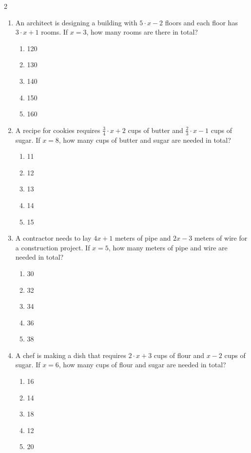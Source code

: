 \documentclass[10pt]{article}
\begin{document}
\begin{multicols}{2}
\begin{enumerate}[label=\textbf{Q\arabic*.}, leftmargin=*, itemsep=6pt, parsep=0pt]
  \item \small An architect is designing a building with $5 \cdot x - 2$ floors and each floor has $3 \cdot x + 1$ rooms. If $x = 3$, how many rooms are there in total?
  \begin{enumerate}[label=(\Alph*), leftmargin=0.6cm, nosep, itemsep=2pt]
    \item 120
    \item 130
    \item 140
    \item 150
    \item 160
  \end{enumerate}

  \item \small A recipe for cookies requires $\frac{3}{4} \cdot x + 2$ cups of butter and $\frac{2}{3} \cdot x - 1$ cups of sugar. If $x = 8$, how many cups of butter and sugar are needed in total?
  \begin{enumerate}[label=(\Alph*), leftmargin=0.6cm, nosep, itemsep=2pt]
    \item 11
    \item 12
    \item 13
    \item 14
    \item 15
  \end{enumerate}

  \item \small A contractor needs to lay $4x + 1$ meters of pipe and $2x - 3$ meters of wire for a construction project. If $x = 5$, how many meters of pipe and wire are needed in total?
  \begin{enumerate}[label=(\Alph*), leftmargin=0.6cm, nosep, itemsep=2pt]
    \item 30
    \item 32
    \item 34
    \item 36
    \item 38
  \end{enumerate}

  \item \small A chef is making a dish that requires $2 \cdot x + 3$ cups of flour and $x - 2$ cups of sugar. If $x = 6$, how many cups of flour and sugar are needed in total?
  \begin{enumerate}[label=(\Alph*), leftmargin=0.6cm, nosep, itemsep=2pt]
    \item 16
    \item 14
    \item 18
    \item 12
    \item 20
  \end{enumerate}


\end{enumerate}
\end{multicols}
\end{document}
